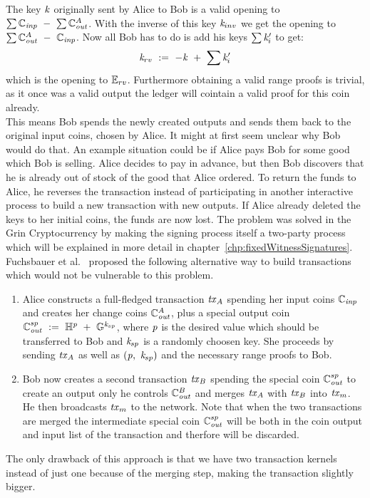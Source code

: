 The key $\mathit{k}$ originally sent by Alice to Bob is a valid opening to $\sum{\mathbb{C}_{\mathit{inp}}} ~-~ \sum{\mathbb{C}_{\mathit{out}}^A}$. With the inverse of this key $\mathit{k}_{inv}$ we get the opening to $\sum{\mathbb{C}_{\mathit{out}}^A ~-~\mathbb{C}_{\mathit{inp}}}$.
Now all Bob has to do is add his keys $\sum{\mathit{k}'_i}$ to get:
\[ \mathit{k}_{rv} ~:=~ -\mathit{k} ~+~ \sum{\mathit{k}'_i} \]
which is the opening to $\mathbb{E}_{rv}$. Furthermore obtaining a valid range proofs is trivial, as it once was a valid output the ledger will cointain a valid proof for this coin already. \\
This means Bob spends the newly created outputs and sends them back to the original input coins, chosen by Alice. It might at first seem unclear why Bob would do that. An example situation could be if Alice
pays Bob for some good which Bob is selling. Alice decides to pay in advance, but then Bob discovers that he is already out of stock of the good that Alice ordered. To return the funds to Alice, he reverses
the transaction instead of participating in another interactive process to build a new transaction with new outputs. If Alice already deleted the keys to her initial coins, the funds are now lost.
The problem was solved in the Grin Cryptocurrency by making the signing process itself a two-party process which will be explained in more detail in chapter~\ref{chp:fixedWitnessSignatures}. \\

Fuchsbauer et al.~\cite{fuchsbauer2019aggregate} proposed the following alternative way to build transactions which would not be vulnerable to this problem.
\begin{enumerate}
    \item Alice constructs a full-fledged transaction $\mathit{tx}_A$ spending her input coins $\mathbb{C}_{\mathit{inp}}$ and creates her change coins $\mathbb{C}_{\mathit{out}}^A$, plus a special output coin $\mathbb{C}_{\mathit{out}}^{sp} ~:=~ \mathbb{H}^{\mathit{p}} ~+~ \mathbb{G}^{\mathit{k}_{sp}}$,
    where $\mathit{p}$ is the desired value which should be transferred to Bob and $\mathit{k}_{sp}$ is a randomly choosen key. She proceeds by sending $\mathit{tx}_A$ as well as $(\mathit{p} ,~ \mathit{k}_{sp})$ and the necessary range
    proofs to Bob.
    \item Bob now creates a second transaction $\mathit{tx}_B$ spending the special coin $\mathbb{C}_{\mathit{out}}^{sp}$ to create an output only he controls $\mathbb{C}_{\mathit{out}}^{B}$ and merges $\mathit{tx}_A$ with $\mathit{tx}_B$
    into $\mathit{tx}_m$. He then broadcasts $\mathit{tx}_m$ to the network. Note that when the two transactions are merged the intermediate special coin $\mathbb{C}_{\mathit{out}}^{sp}$ will be both in the coin output and input list
    of the transaction and therfore will be discarded.
\end{enumerate}
The only drawback of this approach is that we have two transaction kernels instead of just one because of the merging step, making the transaction slightly bigger.


